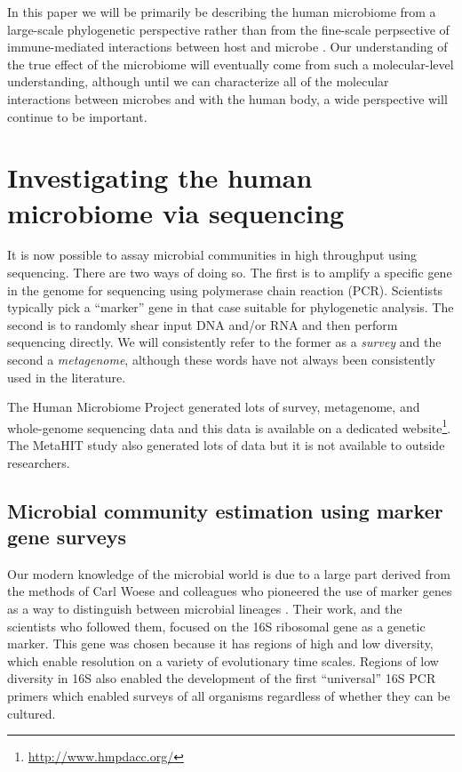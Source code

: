 \documentclass{amsart}
\begin{document}
In this paper we will be primarily be describing the human microbiome from a large-scale phylogenetic perspective rather than from the fine-scale perpsective of immune-mediated interactions between host and microbe \citep[reviewed in][]{hooper2012interactions}.
Our understanding of the true effect of the microbiome will eventually come from such a molecular-level understanding, although until we can characterize all of the molecular interactions between microbes and with the human body, a wide perspective will continue to be important.


\section{Investigating the human microbiome via sequencing}
It is now possible to assay microbial communities in high throughput using sequencing.
There are two ways of doing so.
The first is to amplify a specific gene in the genome for sequencing using polymerase chain reaction (PCR).
Scientists typically pick a ``marker'' gene in that case suitable for phylogenetic analysis.
The second is to randomly shear input DNA and/or RNA and then perform sequencing directly.
We will consistently refer to the former as a \textit{survey} and the second a \textit{metagenome}, although these words have not always been consistently used in the literature.

The Human Microbiome Project \citep{methe2012framework} generated lots of survey, metagenome, and whole-genome sequencing data and this data is available on a dedicated website\footnote{\url{http://www.hmpdacc.org/}}.
The MetaHIT study \citep{qin2010human} also generated lots of data but it is not available to outside researchers.

\subsection{Microbial community estimation using marker gene surveys}
Our modern knowledge of the microbial world is due to a large part derived from the methods of Carl Woese and colleagues who pioneered the use of marker genes as a way to distinguish between microbial lineages \citep{fox1977comparative}.
Their work, and the scientists who followed them, focused on the 16S ribosomal gene as a genetic marker.
This gene was chosen because it has regions of high and low diversity, which enable resolution on a variety of evolutionary time scales.
Regions of low diversity in 16S also enabled the development of the first ``universal'' 16S PCR primers \citep{lane1985rapid} which enabled surveys of all organisms regardless of whether they can be cultured.
\end{document}
